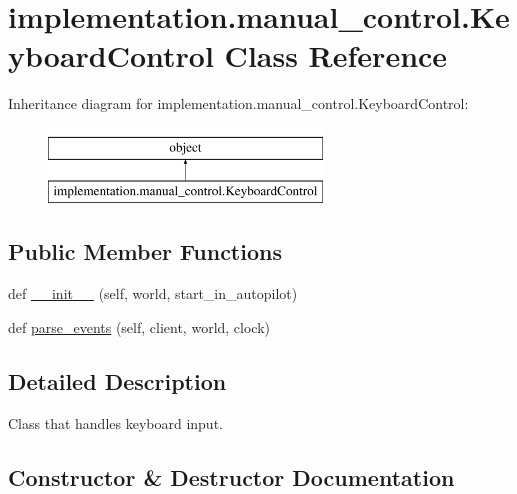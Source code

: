 \hypertarget{classimplementation_1_1manual__control_1_1_keyboard_control}{}\section{implementation.\+manual\+\_\+control.\+Keyboard\+Control Class Reference}
\label{classimplementation_1_1manual__control_1_1_keyboard_control}
Inheritance diagram for implementation.\+manual\+\_\+control.\+Keyboard\+Control\+:\begin{figure}[H]
\begin{center}
\leavevmode
\includegraphics[height=2.000000cm]{classimplementation_1_1manual__control_1_1_keyboard_control}
\end{center}
\end{figure}
\subsection*{Public Member Functions}
\begin{DoxyCompactItemize}
\item 
def \hyperlink{classimplementation_1_1manual__control_1_1_keyboard_control_adeaf1dd5883f6ee4548ad8ee00ee9099}{\+\_\+\+\_\+init\+\_\+\+\_\+} (self, world, start\+\_\+in\+\_\+autopilot)
\item 
def \hyperlink{classimplementation_1_1manual__control_1_1_keyboard_control_a1217f115f0929922b01ba00a4aebf42c}{parse\+\_\+events} (self, client, world, clock)
\end{DoxyCompactItemize}


\subsection{Detailed Description}
\begin{DoxyVerb}Class that handles keyboard input.\end{DoxyVerb}
 

\subsection{Constructor \& Destructor Documentation}
\mbox{\label{classimplementation_1_1manual__control_1_1_keyboard_control_adeaf1dd5883f6ee4548ad8ee00ee9099}} 
